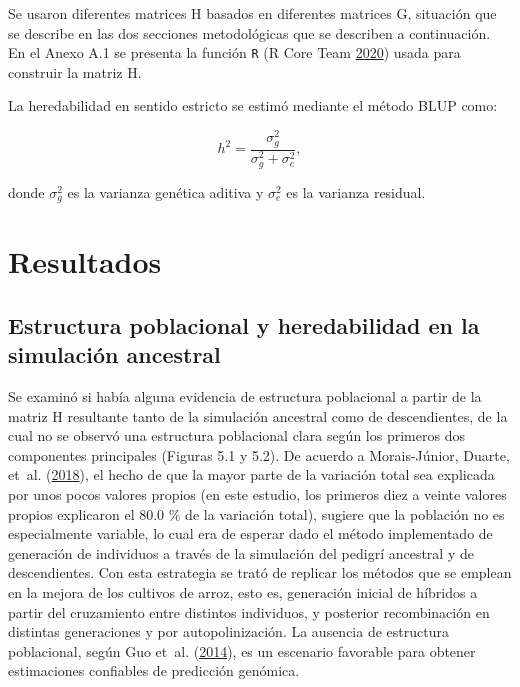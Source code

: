 \documentclass[11pt,spanish,a4paper,oneside,]{book} %
\begin{document}
Se usaron diferentes matrices H basados en diferentes matrices G, situación que se describe en las dos secciones metodológicas que se describen a continuación. En el Anexo A.1 se presenta la función \texttt{R} (R Core Team \protect\hyperlink{ref-cite:52}{2020}) usada para construir la matriz H.

La heredabilidad en sentido estricto se estimó mediante el método BLUP como:

\begin{equation}
h^{2} = \frac{\sigma^{2}_{g}}{\sigma^{2}_{g} + \sigma^{2}_{e}},
\end{equation}

donde \(\sigma^{2}_{g}\) es la varianza genética aditiva y \(\sigma^{2}_{e}\) es la varianza residual.

\hypertarget{resultados}{%
\chapter{Resultados}\label{resultados}}

\hypertarget{estructura-poblacional-y-heredabilidad-en-la-simulaciuxf3n-ancestral}{%
\section{Estructura poblacional y heredabilidad en la simulación ancestral}\label{estructura-poblacional-y-heredabilidad-en-la-simulaciuxf3n-ancestral}}

Se examinó si había alguna evidencia de estructura poblacional a partir de la matriz H resultante tanto de la simulación ancestral como de descendientes, de la cual no se observó una estructura poblacional clara según los primeros dos componentes principales (Figuras 5.1 y 5.2). De acuerdo a Morais-Júnior, Duarte, et~al. (\protect\hyperlink{ref-cite:69}{2018}), el hecho de que la mayor parte de la variación total sea explicada por unos pocos valores propios (en este estudio, los primeros diez a veinte valores propios explicaron el 80.0 \% de la variación total), sugiere que la población no es especialmente variable, lo cual era de esperar dado el método implementado de generación de individuos a través de la simulación del pedigrí ancestral y de descendientes. Con esta estrategia se trató de replicar los métodos que se emplean en la mejora de los cultivos de arroz, esto es, generación inicial de híbridos a partir del cruzamiento entre distintos individuos, y posterior recombinación en distintas generaciones y por autopolinización. La ausencia de estructura poblacional, según Guo et~al. (\protect\hyperlink{ref-cite:70}{2014}), es un escenario favorable para obtener estimaciones confiables de predicción genómica.
\end{document}
